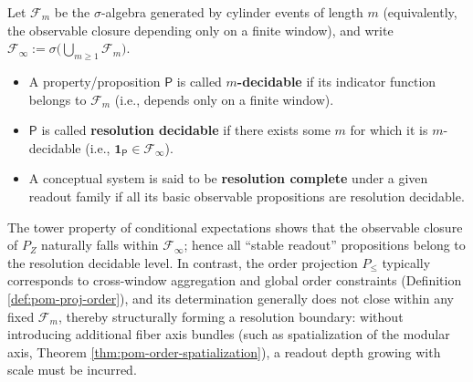 \begin{definition}\label{def:pom-resolution-completeness}
Let $\mathcal{F}_m$ be the $\sigma$-algebra generated by cylinder events of length $m$ (equivalently, the observable closure depending only on a finite window), and write $\mathcal{F}_\infty:=\sigma\!\bigl(\bigcup_{m\ge 1}\mathcal{F}_m\bigr)$.
\begin{itemize}
  \item A property/proposition $\mathsf{P}$ is called \textbf{$m$-decidable} if its indicator function belongs to $\mathcal{F}_m$ (i.e., depends only on a finite window).
  \item $\mathsf{P}$ is called \textbf{resolution decidable} if there exists some $m$ for which it is $m$-decidable (i.e., $\mathbf{1}_{\mathsf P}\in\mathcal{F}_\infty$).
  \item A conceptual system is said to be \textbf{resolution complete} under a given readout family if all its basic observable propositions are resolution decidable.
\end{itemize}
\end{definition}

\begin{remark}\label{rem:pom-resolution-boundary}
The tower property of conditional expectations shows that the observable closure of $P_Z$ naturally falls within $\mathcal{F}_\infty$; hence all ``stable readout'' propositions belong to the resolution decidable level. In contrast, the order projection $P_{\le}$ typically corresponds to cross-window aggregation and global order constraints (Definition \ref{def:pom-proj-order}), and its determination generally does not close within any fixed $\mathcal{F}_m$, thereby structurally forming a resolution boundary: without introducing additional fiber axis bundles (such as spatialization of the modular axis, Theorem \ref{thm:pom-order-spatialization}), a readout depth growing with scale must be incurred.
\end{remark}
